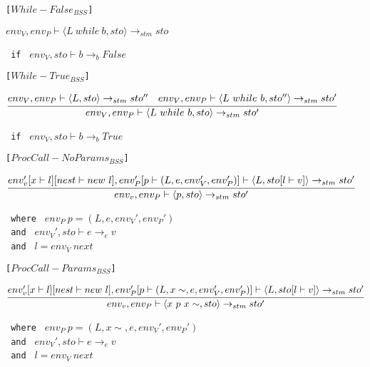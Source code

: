 {\texttt{[$While-False_{BSS}$]}\\
\begin{center}
	\begin{math}
		{env_V, env_P \vdash \langle L\ while\ b, sto \rangle \rightarrow_{stm} sto}
	\end{math}
	
	\texttt{ if } $env_V, sto \vdash b \rightarrow_b False$
\end{center}

\texttt{[$While-True_{BSS}$]}\\
\begin{center}
	\begin{math}
		\cfrac
			{env_V, env_P \vdash \langle L, sto \rangle \rightarrow_{stm} sto'' \quad env_V, env_P \vdash \langle L\ while\ b, sto'' \rangle \rightarrow_{stm} sto'}
			{env_V, env_P \vdash \langle L\ while\ b, sto \rangle \rightarrow_{stm} sto'}
	\end{math}
	
	\texttt{ if } $env_V, sto \vdash b \rightarrow_b True$
\end{center}

\texttt{[$ProcCall-NoParams_{BSS}$]}\\
\begin{center}
	\begin{math}
		\cfrac
			{env_v'[x \vdash l][nest \vdash new\ l], env_P'[p \vdash (L, e, env_V', env_P')] \vdash \langle L, sto[l \vdash v] \rangle \rightarrow_{stm} sto'}
			{env_v, env_P \vdash \langle p, sto \rangle \rightarrow_{stm} sto'}
	\end{math}
	
	\texttt{ where } $env_P\ p = (L, e, env_V', env_P')$\\
	\texttt{ and } $ env_V', sto \vdash e \rightarrow_{e} v$\\
	\texttt{ and } $l = env_V\ next$
\end{center}

\texttt{[$ProcCall-Params_{BSS}$]}\\
\begin{center}
	\begin{math}
	\cfrac
	{env_v'[x \vdash l][nest \vdash new\ l], env_P'[p \vdash (L, x\sim, e, env_V', env_P')] \vdash \langle L, sto[l \vdash v] \rangle \rightarrow_{stm} sto'}
	{env_v, env_P \vdash \langle x\ p\ x\sim, sto \rangle \rightarrow_{stm} sto'}
	\end{math}
	
	\texttt{ where } $env_P\ p = (L, x\sim, e, env_V', env_P')$\\
	\texttt{ and } $ env_V', sto \vdash e \rightarrow_{e} v$\\
	\texttt{ and } $l = env_V\ next$
\end{center}

}
